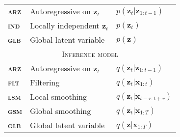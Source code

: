 \begin{table}[t!]
\begin{center}
\begin{tabular}{ l l l }
        \textbf{\textsc{arz}} & Autoregressive on $\mathbf{z}_t$      & $p(\mathbf{z}_t|\mathbf{z}_{1:t-1})$ \\
        \textbf{\textsc{ind}} & Locally independent $\mathbf{z}_t$                 & $p(\mathbf{z}_t)$ \\
        \textbf{\textsc{glb}} & Global latent variable                & $p(\mathbf{z})$ \\
        \midrule
        \multicolumn{3}{c}{\textsc{Inference model}} \\
        \midrule
        \textbf{\textsc{arz}} & Autoregressive on $\mathbf{z}_t$      & $q(\mathbf{z}_t|\mathbf{z}_{1:t-1})$ \\
        \textbf{\textsc{flt}} & Filtering                             & $q(\mathbf{z}_t|\mathbf{x}_{1:t})$ \\
        \textbf{\textsc{lsm}} & Local smoothing                       & $q(\mathbf{z}_t|\mathbf{x}_{t-r:t+r})$ \\
        \textbf{\textsc{gsm}} & Global smoothing                      & $q(\mathbf{z}_t|\mathbf{x}_{1:T})$ \\
        \textbf{\textsc{glb}} & Global latent variable                & $q(\mathbf{z}|\mathbf{x}_{1:T})$ \\
        \bottomrule
    \end{tabular}
    \end{center}
\end{table}

